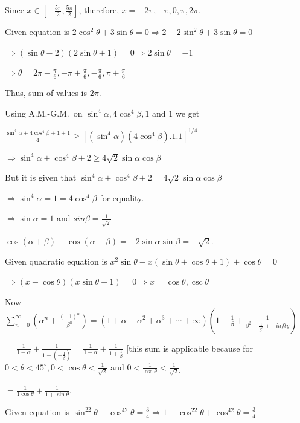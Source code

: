   Since $x\in\left[-\frac{5\pi}{2}, \frac{5\pi}{2}\right]$, therefore, $x = -2\pi, -\pi, 0, \pi,  2\pi$.
\item Given equation is $2\cos^2\theta + 3\sin\theta = 0 \Rightarrow 2 - 2\sin^2\theta + 3\sin\theta = 0$

  $\Rightarrow (\sin\theta - 2)(2\sin\theta + 1) = 0 \Rightarrow 2\sin\theta = -1$

  $\Rightarrow \theta = 2\pi - \frac{\pi}{6}, -\pi + \frac{\pi}{6}, -\frac{\pi}{6}, \pi + \frac{\pi}{6}$

  Thus, sum of values is $2\pi$.
\item Using A.M.-G.M.\ on $\sin^4\alpha, 4\cos^4\beta, 1$ and $1$ we get

  $\frac{\sin^4\alpha + 4\cos^4\beta + 1 +
  1}{4}\geq \left[\left(\sin^4\alpha\right)\left(4\cos^4\beta\right).1.1\right]^{1/4}$

  $\Rightarrow \sin^4\alpha + \cos^4\beta + 2\geq 4\sqrt{2}\sin\alpha\cos\beta$

  But it is given that $\sin^4\alpha + \cos^4\beta + 2 = 4\sqrt{2}\sin\alpha\cos\beta$

  $\Rightarrow \sin^4\alpha = 1 = 4\cos^4\beta$ for equality.

  $\Rightarrow \sin\alpha = 1$ and $sin\beta = \frac{1}{\sqrt{2}}$

  $\cos(\alpha + \beta) - \cos(\alpha - \beta) = -2\sin\alpha\sin\beta = -\sqrt{2}$.
\item Given quadratic equation is $x^2\sin\theta - x(\sin\theta + \cos\theta + 1) + \cos\theta = 0$

  $\Rightarrow (x - \cos\theta)(x\sin\theta - 1) = 0 \Rightarrow x = \cos\theta, \csc\theta$

  Now $\displaystyle\sum_{n = 0}^\infty\left(\alpha^n + \frac{(-1)^n}{\beta^n}\right) = \left(1 + \alpha
  + \alpha^2 + \alpha^3 + \cdots + \infty\right)\left(1 - \frac{1}{\beta} + \frac{1}{\beta^2
    - \frac{1}{\beta^3} + \cdots infty}\right)$

  $= \frac{1}{1 - \alpha} + \frac{1}{1 - \left(-\frac{1}{\beta}\right)} = \frac{1}{1 - \alpha} + \frac{1}{1
    + \frac{1}{\beta}}$ [this sum is applicable because for $0 < \theta < 45^\circ, 0< \cos\theta
    < \frac{1}{\sqrt{2}}$ and $0 < \frac{1}{\csc\theta} < \frac{1}{\sqrt{2}}$]

  $= \frac{1}{1  \cos\theta} + \frac{1}{1 + \sin\theta}$.
\item Given equation is $\sin^22\theta + \cos^42\theta = \frac{3}{4} \Rightarrow 1 - \cos^22\theta
  + \cos^42\theta = \frac{3}{4}$

